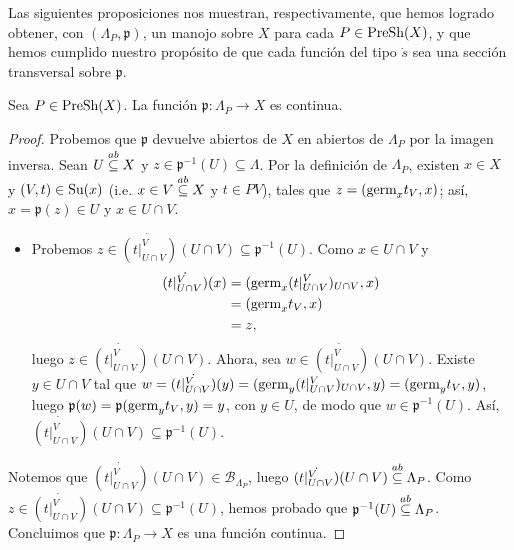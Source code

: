 Las siguientes proposiciones nos muestran, respectivamente, que hemos logrado obtener, con $(\Lambda_{P},\mathfrak{p})$, un manojo sobre $X$ para cada $P\in\normalfont{\text{PreSh}}(X)$, y que hemos cumplido nuestro propósito de que cada función del tipo $\dot{s}$ sea una sección transversal sobre $\mathfrak{p}$.
\begin{Prop}
   Sea $P\in\normalfont{\text{PreSh}}(X)$. La función $\mathfrak{p}:\Lambda_P\to X$ es continua. 
\end{Prop}
\begin{proof}
   Probemos que $\mathfrak{p}$ devuelve abiertos de $X$ en abiertos de $\Lambda_P$ por la imagen inversa. Sean $U\stackrel{ab}{\subseteq} X$ y $z\in\mathfrak{p}^{-1}(U)\subseteq \Lambda$. Por la definición de $\Lambda_P$, existen $x\in X$ y $(V,t)\in\normalfont{\text{Su}}(x)$ (i.e. $x\in V\stackrel{ab}{\subseteq} X$ y $t\in PV$), tales que $z=(\normalfont{\text{germ}}_{x}t_{V},x)$; así, $x=\mathfrak{p}(z)\in U$ y $x\in U\cap V$.
   \begin{itemize}
      \item Probemos $z\in\dot{(t|^{V}_{U\cap V})}(U\cap V)\subseteq\mathfrak{p}^{-1}(U)$. Como $x\in U\cap V$ y
         $$
         \begin{aligned}
            \dot{(t|^{V}_{U\cap V})}(x)&=(\normalfont{\text{germ}}_{x}(t|^{V}_{U\cap V})_{U\cap V},x)\\
                                       &=(\normalfont{\text{germ}}_{x}t_{V},x)\\
                                       &=z,
         \end{aligned}
         $$
         luego $z\in\dot{(t|^{V}_{U\cap V})}(U\cap V)$. Ahora, sea $w\in\dot{(t|^{V}_{U\cap V})}(U\cap V)$. Existe $y\in U\cap V$ tal que $w=\dot{(t|^{V}_{U\cap V})}(y)=(\normalfont{\text{germ}}_{y}(t|^{V}_{U\cap V})_{U\cap V},y)=(\normalfont{\text{germ}}_{y}t_{V},y)$, luego $\mathfrak{p}(w)=\mathfrak{p}(\normalfont{\text{germ}}_{y}t_{V},y)=y$, con $y\in U$, de modo que $w\in\mathfrak{p}^{-1}(U)$. Así, $\dot{(t|^{V}_{U\cap V})}(U\cap V)\subseteq \mathfrak{p}^{-1}(U)$.
   \end{itemize}
   Notemos que $\dot{(t|^{V}_{U\cap V})}(U\cap V)\in\mathcal{B}_{\Lambda_P}$, luego $\dot{(t|^{V}_{U\cap V})}(U\cap V)\stackrel{ab}{\subseteq} \Lambda_P$. Como $z\in\dot{(t|^{V}_{U\cap V})}(U\cap V)\subseteq \mathfrak{p}^{-1}(U)$, hemos probado que $\mathfrak{p}^{-1}(U)\stackrel{ab}{\subseteq} \Lambda_P$. Concluimos que $\mathfrak{p}:\Lambda_P\to X$ es una función continua. 
\end{proof}
